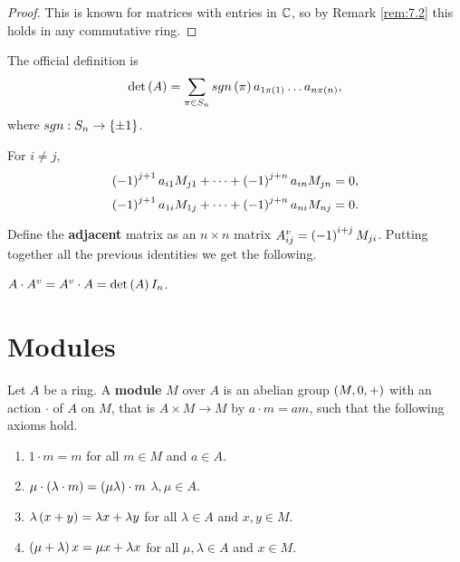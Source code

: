 \begin{proof}
This is known for matrices with entries in $ \mathbb{C} $, so by Remark \ref{rem:7.2} this holds in any commutative ring.
\end{proof}

\begin{remark}
The official definition is
$$ \det\left( A \right) = \sum_{\pi \in S_n} sgn\left( \pi \right)a_{1\pi\left( 1 \right)} \dots a_{n\pi\left( n \right)}, $$
where $ sgn : S_n \to \left\{ \pm 1 \right\} $.
\end{remark}

\begin{proposition}
For $ i \ne j $,
$$ \left( -1 \right)^{j + 1}a_{i1}M_{j1} + \dots + \left( -1 \right)^{j + n}a_{in}M_{jn} = 0, $$
$$ \left( -1 \right)^{j + 1}a_{1i}M_{1j} + \dots + \left( -1 \right)^{j + n}a_{ni}M_{nj} = 0. $$
\end{proposition}

Define the \textbf{adjacent} matrix as an $ n \times n $ matrix $ A^v_{ij} = \left( -1 \right)^{i + j}M_{ji} $. Putting together all the previous identities we get the following.

\begin{theorem}
$ A \cdot A^v = A^v \cdot A = \det\left( A \right) I_n $.
\end{theorem}

\pagebreak

\section{Modules}


\begin{definition}
Let $ A $ be a ring. A \textbf{module} $ M $ over $ A $ is an abelian group $ \left( M, 0, + \right) $ with an action $ \cdot $ of $ A $ on $ M $, that is $ A \times M \to M $ by $ a \cdot m = am $, such that the following axioms hold.
\begin{enumerate}
\item $ 1 \cdot m = m $ for all $ m \in M $ and $ a \in A $.
\item $ \mu \cdot \left( \lambda \cdot m \right) = \left( \mu\lambda \right) \cdot m $ $ \lambda, \mu \in A $.
\item $ \lambda\left( x + y \right) = \lambda x + \lambda y $ for all $ \lambda \in A $ and $ x, y \in M $.
\item $ \left( \mu + \lambda \right)x = \mu x + \lambda x $ for all $ \mu, \lambda \in A $ and $ x \in M $.
\end{enumerate}
\end{definition}

